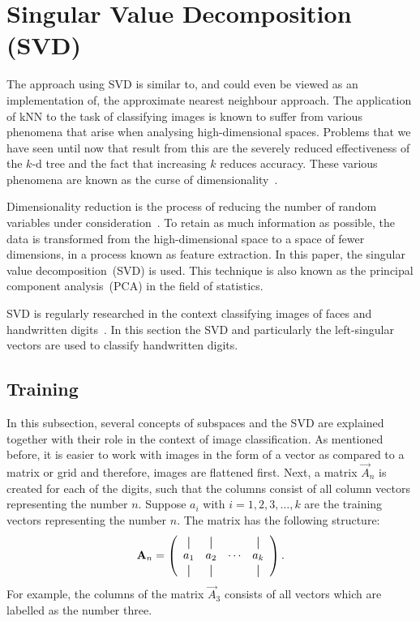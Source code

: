 \section{Singular Value Decomposition (SVD)}\label{s:svd_all}
The approach using SVD is similar to, and could even be viewed as an implementation of, the approximate nearest neighbour approach.
The application of kNN to the task of classifying images is known to suffer from various phenomena that arise when analysing high-dimensional spaces.
Problems that we have seen until now that result from this are the severely reduced effectiveness of the \(k\)-d tree and the fact that increasing \(k\) reduces accuracy.
These various phenomena are known as the curse of dimensionality~\cite{Beyer1999}.

Dimensionality reduction is the process of reducing the number of random variables under consideration~\cite{Roweis2000}.
To retain as much information as possible, the data is transformed from the high-dimensional space to a space of fewer dimensions, in a process known as feature extraction.
In this paper, the singular value decomposition~(SVD) is used. This technique is also known as the principal component analysis~(PCA) in the field of statistics.

SVD is regularly researched in the context classifying images of faces and handwritten digits~\cite{Cao2006, Savas2007}.
In this section the SVD and particularly the left-singular vectors are used to classify handwritten digits.

\subsection{Training}\label{s:svd:training}
In this subsection, several concepts of subspaces and the SVD are explained together with their role in the context of image classification.
As mentioned before, it is easier to work with images in the form of a vector as compared to a matrix or grid and therefore, images are flattened first.
Next, a matrix \(\vec{A}_n\) is created for each of the digits, such that the columns consist of all column vectors representing the number \(n\).
Suppose \(a_i\) with \(i = 1, 2, 3, \ldots, k\) are the training vectors representing the number \(n\).
The matrix has the following structure:
\[
    \vec{A}_n =
    \left(
    \begin{array}{cccc}
            \vertbar & \vertbar &        & \vertbar \\
            a_1      & a_2      & \cdots & a_k      \\
            \vertbar & \vertbar &        & \vertbar \\
        \end{array}
    \right).
\]
For example, the columns of the matrix \(\vec{A}_3\) consists of all vectors which are labelled as the number three.

